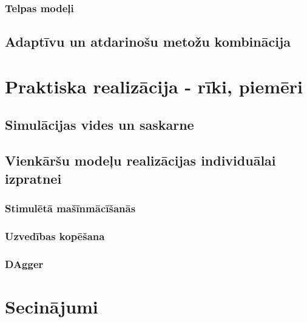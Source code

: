 \documentclass[12pt, a4paper]{article}
\numberwithin{equation}{section} %
\begin{document}
\subsubsection{Telpas modeļi}

\subsection{Adaptīvu un atdarinošu metožu kombinācija}


\newpage
\section{Praktiska realizācija - rīki, piemēri}

\subsection{Simulācijas vides un saskarne}

\subsection{Vienkāršu modeļu realizācijas individuālai izpratnei}

\subsubsection{Stimulētā mašīnmācīšanās}

\subsubsection{Uzvedības kopēšana}

\subsubsection{DAgger}

\newpage
\section*{Secinājumi}




\newpage
\printbibliography[title=Atsauces]
\end{document}
